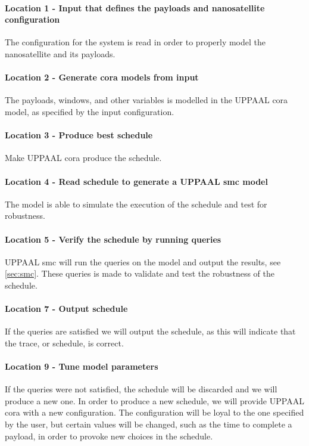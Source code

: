 \paragraph{Location 1 - Input that defines the payloads and nanosatellite configuration} 
The configuration for the system is read in order to properly model the nanosatellite and its payloads.

\paragraph{Location 2 - Generate \gls{cora} models from input} 
The payloads, windows, and other variables is modelled in the UPPAAL \gls{cora} model, as specified by the input configuration.

\paragraph{Location 3 - Produce best schedule} 
Make UPPAAL \gls{cora}  produce the schedule.

\paragraph{Location 4 - Read schedule to generate a UPPAAL \gls{smc} model}
The model is able to simulate the execution of the schedule and test for robustness.

\paragraph{Location 5 - Verify the schedule by running queries} 
UPPAAL \gls{smc} will run the queries on the model and output the results, see \cref{sec:smc}. 
These queries is made to validate and test the robustness of the schedule.

\paragraph{Location 7 - Output schedule} 
If the queries are satisfied we will output the schedule, as this will indicate that the trace, or schedule, is correct.

\paragraph{Location 9 - Tune model parameters} 
If the queries were not satisfied, the schedule will be discarded and we will produce a new one. 
In order to produce a new schedule, we will provide UPPAAL \gls{cora} with a new configuration. 
The configuration will be loyal to the one specified by the user, but certain values will be changed, such as the time to complete a payload, in order to provoke new choices in the schedule. 

